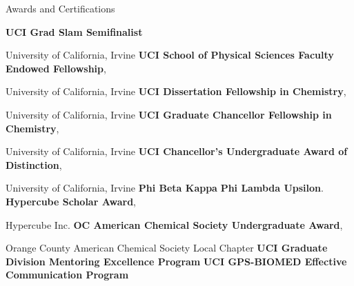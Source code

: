 \begin{rubric}{Awards and Certifications}

  \entry*[Feb 2022] \textbf{UCI Grad Slam Semifinalist}
  
  University of California, Irvine
  \entry*[Jun 2021] \textbf{UCI School of Physical Sciences Faculty Endowed Fellowship},

  University of California, Irvine
  \entry*[Jun 2021] \textbf{UCI Dissertation Fellowship in Chemistry},
  
  University of California, Irvine
  \entry*[Sept 2016] \textbf{UCI Graduate Chancellor Fellowship in Chemistry},
  
  University of California, Irvine
  \entry*[Jun 2015] \textbf{UCI Chancellor's Undergraduate Award of Distinction},
  
  University of California, Irvine
  \entry*[May 2015] \textbf{Phi Beta Kappa}
  \entry*[May 2015] \textbf{Phi Lambda Upsilon}.
  \entry*[Jun 2014] \textbf{Hypercube Scholar Award},
  
  Hypercube Inc.
  \entry*[Apr 2014] \textbf{OC American Chemical Society Undergraduate Award},
  
  Orange County American Chemical Society Local Chapter
  \entry*[Mar 2020] \textbf{UCI Graduate Division Mentoring Excellence Program}
  \entry*[Jun 2017] \textbf{UCI GPS-BIOMED Effective Communication Program} 
\end{rubric}
